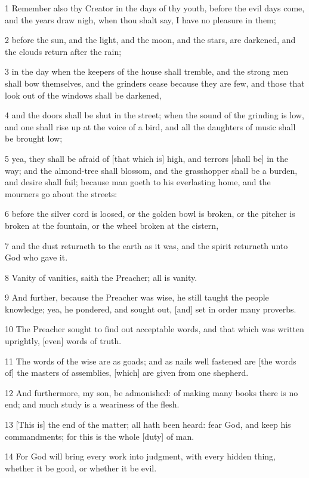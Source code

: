 \par 1 Remember also thy Creator in the days of thy youth, before the evil days come, and the years draw nigh, when thou shalt say, I have no pleasure in them;
\par 2 before the sun, and the light, and the moon, and the stars, are darkened, and the clouds return after the rain;
\par 3 in the day when the keepers of the house shall tremble, and the strong men shall bow themselves, and the grinders cease because they are few, and those that look out of the windows shall be darkened,
\par 4 and the doors shall be shut in the street; when the sound of the grinding is low, and one shall rise up at the voice of a bird, and all the daughters of music shall be brought low;
\par 5 yea, they shall be afraid of [that which is] high, and terrors [shall be] in the way; and the almond-tree shall blossom, and the grasshopper shall be a burden, and desire shall fail; because man goeth to his everlasting home, and the mourners go about the streets:
\par 6 before the silver cord is loosed, or the golden bowl is broken, or the pitcher is broken at the fountain, or the wheel broken at the cistern,
\par 7 and the dust returneth to the earth as it was, and the spirit returneth unto God who gave it.
\par 8 Vanity of vanities, saith the Preacher; all is vanity.
\par 9 And further, because the Preacher was wise, he still taught the people knowledge; yea, he pondered, and sought out, [and] set in order many proverbs.
\par 10 The Preacher sought to find out acceptable words, and that which was written uprightly, [even] words of truth.
\par 11 The words of the wise are as goads; and as nails well fastened are [the words of] the masters of assemblies, [which] are given from one shepherd.
\par 12 And furthermore, my son, be admonished: of making many books there is no end; and much study is a weariness of the flesh.
\par 13 [This is] the end of the matter; all hath been heard: fear God, and keep his commandments; for this is the whole [duty] of man.
\par 14 For God will bring every work into judgment, with every hidden thing, whether it be good, or whether it be evil.

